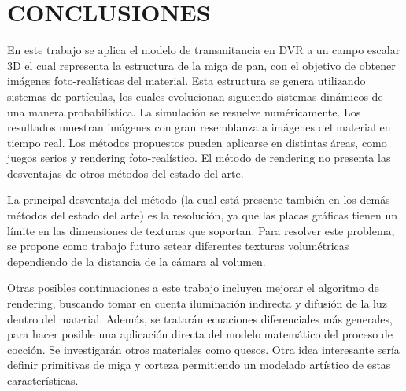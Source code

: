 \documentclass[oneside,a4paper,spanish,links]{amca}
\begin{document}



\section{CONCLUSIONES}

En este trabajo se aplica el modelo de transmitancia en DVR a un campo escalar 3D el cual representa la estructura de la miga de pan, con el objetivo de obtener im\'agenes foto-real\'isticas del material. Esta estructura se genera utilizando sistemas de part\'iculas, los cuales evolucionan siguiendo sistemas din\'amicos de una manera probabil\'istica. La simulaci\'on se resuelve num\'ericamente. Los resultados muestran im\'agenes con gran resemblanza a im\'agenes del material en tiempo real. Los m\'etodos propuestos pueden aplicarse en distintas \'areas, como juegos serios \citep{Susi2007} y rendering foto-real\'istico. El m\'etodo de rendering no presenta las desventajas de otros m\'etodos del estado del arte.

La principal desventaja del m\'etodo (la cual est\'a presente tambi\'en en los dem\'as m\'etodos del estado del arte) es la resoluci\'on, ya que las placas gr\'aficas tienen un l\'imite en las dimensiones de texturas que soportan. Para resolver este problema, se propone como trabajo futuro setear diferentes texturas volum\'etricas dependiendo de la distancia de la c\'amara al volumen.

Otras posibles continuaciones a este trabajo incluyen mejorar el algoritmo de rendering, buscando tomar en cuenta iluminaci\'on indirecta y difusión de la luz dentro del material. Adem\'as, se tratar\'an ecuaciones diferenciales m\'as generales, para hacer posible una aplicaci\'on directa del modelo matem\'atico del proceso de cocci\'on. Se investigar\'an otros materiales como quesos. Otra idea interesante ser\'ia definir primitivas de miga y corteza permitiendo un modelado art\'istico de estas caracter\'isticas. 

%

\end{document}
